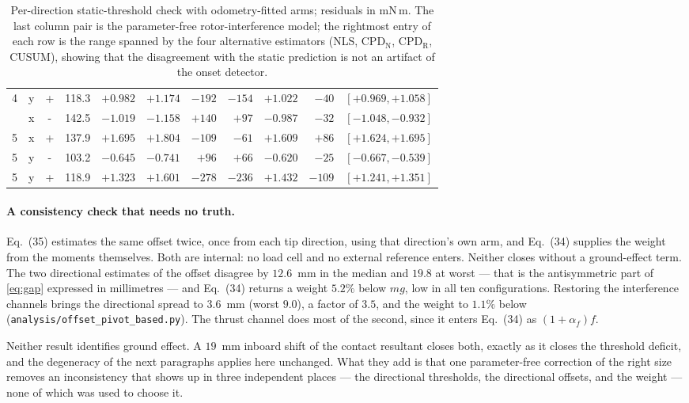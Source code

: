 \documentclass[10pt]{article}
\begin{document}
\begin{table}[t]
\begin{tabular}{ccc r r rr r rr c}
4 & y & + & 118.3 & $+0.982$ & $+1.174$ & $-192$ & $-154$ & $+1.022$ & $-40$ & $[+0.969, +1.058]$ \\
\addlinespace[2pt]
5 & x & - & 142.5 & $-1.019$ & $-1.158$ & $+140$ & $+97$ & $-0.987$ & $-32$ & $[-1.048, -0.932]$ \\
5 & x & + & 137.9 & $+1.695$ & $+1.804$ & $-109$ & $-61$ & $+1.609$ & $+86$ & $[+1.624, +1.695]$ \\
5 & y & - & 103.2 & $-0.645$ & $-0.741$ & $+96$ & $+66$ & $-0.620$ & $-25$ & $[-0.667, -0.539]$ \\
5 & y & + & 118.9 & $+1.323$ & $+1.601$ & $-278$ & $-236$ & $+1.432$ & $-109$ & $[+1.241, +1.351]$ \\
\bottomrule
\end{tabular}
\caption{Per-direction static-threshold check with odometry-fitted
arms; residuals in mN\,m. The last column pair is the parameter-free
rotor-interference model; the rightmost entry of each row is the range
spanned by the four alternative estimators (NLS,
CPD$_{\mathrm{N}}$, CPD$_{\mathrm{R}}$, CUSUM), showing that the
disagreement with the static prediction is not an artifact of the
onset detector.}
\label{tab:static}
\end{table}

\paragraph{A consistency check that needs no truth.}
Eq.~(35) estimates the same offset twice, once from each tip
direction, using that direction's own arm, and Eq.~(34) supplies the
weight from the moments themselves. Both are internal: no load cell
and no external reference enters. Neither closes without a
ground-effect term. The two directional estimates of the offset
disagree by $12.6$~mm in the median and $19.8$ at worst --- that is
the antisymmetric part of \eqref{eq:gap} expressed in millimetres ---
and Eq.~(34) returns a weight $5.2\%$ below $mg$, low in all ten
configurations. Restoring the interference channels brings the
directional spread to $3.6$~mm (worst $9.0$), a factor of $3.5$, and
the weight to $1.1\%$ below
(\texttt{analysis/offset\_pivot\_based.py}). The thrust channel does
most of the second, since it enters Eq.~(34) as $(1+\alpha_f)f$.

Neither result identifies ground effect. A $19$~mm inboard shift of
the contact resultant closes both, exactly as it closes the threshold
deficit, and the degeneracy of the next paragraphs applies here
unchanged. What they add is that one parameter-free correction of the
right size removes an inconsistency that shows up in three
independent places --- the directional thresholds, the directional
offsets, and the weight --- none of which was used to choose it.
\end{document}
